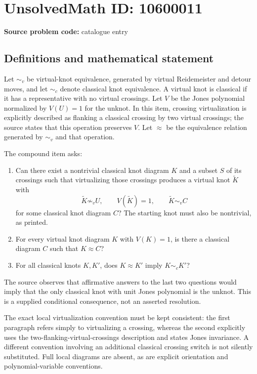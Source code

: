 \documentclass[11pt]{article}
\begin{document}
\section*{UnsolvedMath ID: 10600011}
\textbf{Source problem code:} catalogue entry
\subsection{Definitions and mathematical statement}
Let \(\sim_v\) be virtual-knot equivalence, generated by virtual Reidemeister and detour moves, and let \(\sim_c\) denote classical knot equivalence. A virtual knot is classical if it has a representative with no virtual crossings. Let \(V\) be the Jones polynomial normalized by \(V(U)=1\) for the unknot. In this item, crossing virtualization is explicitly described as flanking a classical crossing by two virtual crossings; the source states that this operation preserves \(V\). Let \(\approx\) be the equivalence relation generated by \(\sim_v\) and that operation.

The compound item asks:
\begin{enumerate}
\item Can there exist a nontrivial classical knot diagram \(K\) and a subset \(S\) of its crossings such that virtualizing those crossings produces a virtual knot \(\widetilde K\) with
\[
 \widetilde K\not\sim_v U,\qquad V(\widetilde K)=1,
 \qquad \widetilde K\sim_v C
\]
for some classical knot diagram \(C\)? The starting knot must also be nontrivial, as printed.
\item For every virtual knot diagram \(K\) with \(V(K)=1\), is there a classical diagram \(C\) such that \(K\approx C\)?
\item For all classical knots \(K,K'\), does \(K\approx K'\) imply \(K\sim_c K'\)?
\end{enumerate}
The source observes that affirmative answers to the last two questions would imply that the only classical knot with unit Jones polynomial is the unknot. This is a supplied conditional consequence, not an asserted resolution.

The exact local virtualization convention must be kept consistent: the first paragraph refers simply to virtualizing a crossing, whereas the second explicitly uses the two-flanking-virtual-crossings description and states Jones invariance. A different convention involving an additional classical crossing switch is not silently substituted. Full local diagrams are absent, as are explicit orientation and polynomial-variable conventions.
\end{document}
